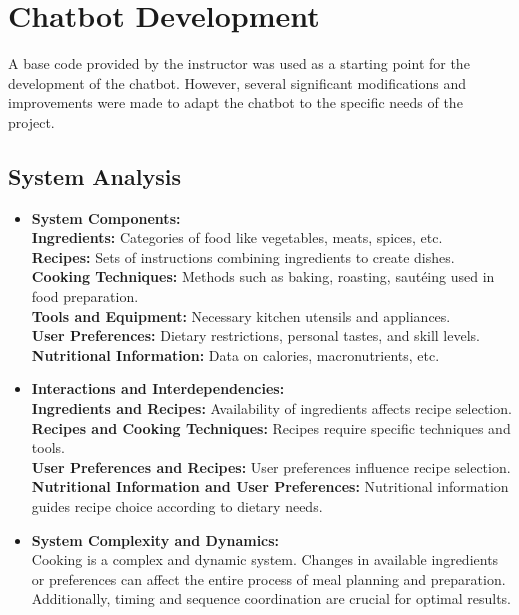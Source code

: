 \documentclass{article}
\begin{document}
\section{Chatbot Development}

A base code provided by the instructor was used as a starting point for the development of the chatbot. However, several significant modifications and improvements were made to adapt the chatbot to the specific needs of the project.

\subsection{System Analysis}

\begin{itemize}
    \item \textbf{System Components: }\\
\textbf{Ingredients:} Categories of food like vegetables, meats, spices, etc.\\
\textbf{Recipes:} Sets of instructions combining ingredients to create dishes.\\
\textbf{Cooking Techniques:} Methods such as baking, roasting, sautéing used in food preparation.\\
\textbf{Tools and Equipment:} Necessary kitchen utensils and appliances.\\
\textbf{User Preferences:} Dietary restrictions, personal tastes, and skill levels.\\
\textbf{Nutritional Information:} Data on calories, macronutrients, etc.\\
    
    \item \textbf{Interactions and Interdependencies: }\\
\textbf{Ingredients and Recipes:} Availability of ingredients affects recipe selection.\\
\textbf{Recipes and Cooking Techniques:} Recipes require specific techniques and tools.\\
\textbf{User Preferences and Recipes:} User preferences influence recipe selection.\\
\textbf{Nutritional Information and User Preferences:} Nutritional information guides recipe choice according to dietary needs.\\
    
    \item \textbf{System Complexity and Dynamics:}\\
Cooking is a complex and dynamic system. Changes in available ingredients or preferences can affect the entire process of meal planning and preparation. Additionally, timing and sequence coordination are crucial for optimal results.
\end{itemize}
\end{document}
